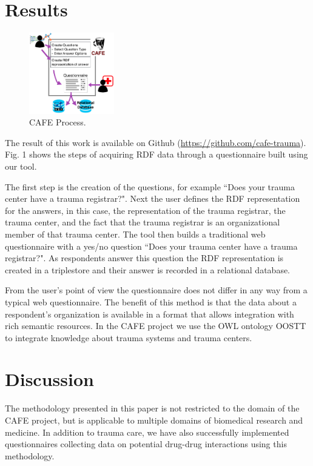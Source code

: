\documentclass{amia}
\begin{document}
\section*{Results}
\begin{figure}
  \vspace{-10mm}
  \begin{center}
    \includegraphics[width=0.33\textwidth]{pics/cafe_process6.png}
  \end{center}
  \caption{CAFE Process.}
  \label{cafe_process}
\end{figure}

The result of this work is available on Github (\href{https://github.com/cafe-trauma}{https://github.com/cafe-trauma}). Fig. 1 shows the steps of acquiring RDF data through a questionnaire built using our tool.

The first step is the creation of the questions, for example ``Does your trauma center have a trauma registrar?". 
Next the user defines the RDF representation for the answers, in this case, the representation of the trauma registrar, the trauma center, and the fact that the trauma registrar is an organizational member of that trauma center.
The tool then builds a traditional web questionnaire with a yes/no question ``Does your trauma center have a trauma registrar?".
As respondents answer this question the RDF representation is created in a triplestore and their answer is recorded in a relational database.

From the user's point of view the questionnaire does not differ in any way from a typical web questionnaire.
The benefit of this method is that the data about a respondent's organization is available in a format that allows integration with rich semantic resources.
In the CAFE project we use the OWL ontology OOSTT \cite{ref3} to integrate knowledge about trauma systems and trauma centers.

\section*{Discussion}
The methodology presented in this paper is not restricted to the domain of the CAFE project, but is applicable to multiple domains of biomedical research and medicine. In addition to trauma care, we have also successfully implemented questionnaires collecting data on potential drug-drug interactions using this methodology.
\end{document}
